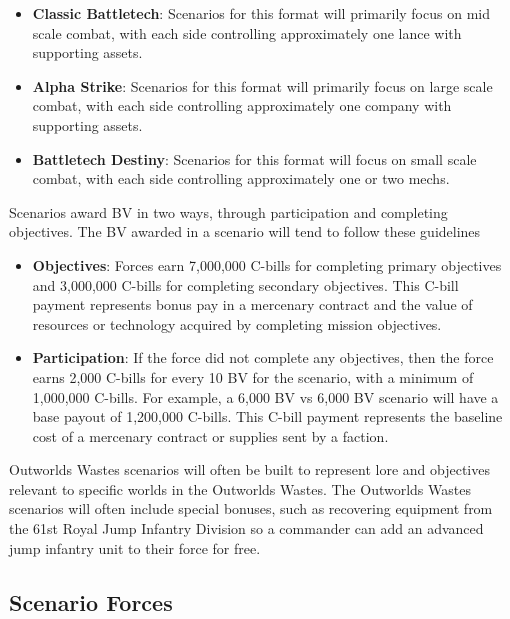 \documentclass[UTF8]{article}
\begin{document}
\begin{itemize}

\item {\bf Classic Battletech}: Scenarios for this format will primarily focus on mid scale combat, with each side controlling approximately one lance with supporting assets.

\item {\bf Alpha Strike}: Scenarios for this format will primarily focus on large scale combat, with each side controlling approximately one company with supporting assets.

\item {\bf Battletech Destiny}: Scenarios for this format will focus on small scale combat, with each side controlling approximately one or two mechs.

\end{itemize}

Scenarios award BV in two ways, through participation and completing objectives.
The BV awarded in a scenario will tend to follow these guidelines

\begin{itemize}

\item {\bf Objectives}: Forces earn 7,000,000 C-bills for completing primary objectives and 3,000,000 C-bills for completing secondary objectives.
This C-bill payment represents bonus pay in a mercenary contract and the value of resources or technology acquired by completing mission objectives.

\item {\bf Participation}: If the force did not complete any objectives, then the force earns 2,000 C-bills for every 10 BV for the scenario, with a minimum of 1,000,000 C-bills.
For example, a 6,000 BV vs 6,000 BV scenario will have a base payout of 1,200,000 C-bills.
This C-bill payment represents the baseline cost of a mercenary contract or supplies sent by a faction.

\end{itemize}

Outworlds Wastes scenarios will often be built to represent lore and objectives relevant to specific worlds in the Outworlds Wastes.
The Outworlds Wastes scenarios will often include special bonuses, such as recovering equipment from the 61st Royal Jump Infantry Division so a commander can add an advanced jump infantry unit to their force for free.\\

\subsection{Scenario Forces}
\end{document}
